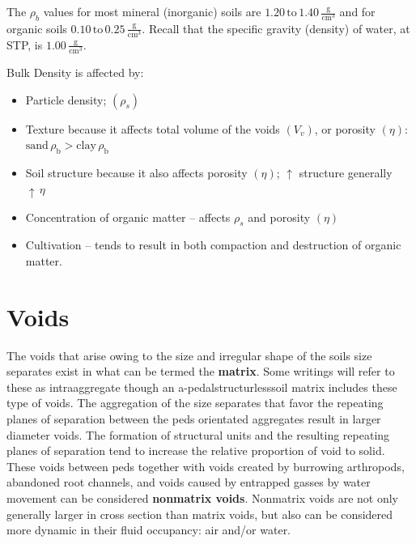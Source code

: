 \documentclass[a5paper]{book}
\begin{document}
The $\rho_b$ values for most mineral (inorganic) soils are $1.20\,\text{to}\,1.40\,\frac{\text{g}}{\text{cm}^3}$ and for organic soils $0.10\,\text{to}\,0.25\,\frac{\text{g}}{\text{cm}^3}$. Recall that the specific gravity (density) of water, at STP, is $1.00\,\frac{\text{g}}{\text{cm}^3}$.

Bulk Density is affected by:
\begin{itemize}
    \item Particle density; $\left(\rho_s\right)$
    \item Texture because it affects total volume of the voids $\left(V_v\right)$, or porosity $\left(\eta\right)$:  $\text{sand}\,\rho_{\text{b}} > \text{clay}\,\rho_{\text{b}}$
    \item Soil structure because it also affects porosity $\left(\eta\right)$; $\uparrow$  structure generally $\uparrow\,\eta$
    \item Concentration of organic matter – affects $\rho_s$ and porosity $\left(\eta\right)$
    \item Cultivation – tends to result in both compaction and destruction of organic matter.
\end{itemize}

\section{Voids}

The voids that arise owing to the size and irregular shape of the soils size separates exist in what can be termed the \textbf{matrix}. Some writings will refer to these as intraaggregate though an a-pedal\textemdash{}structurless\textemdash{}soil matrix includes these type of voids. The aggregation of the size separates that favor the repeating planes of separation between the peds orientated aggregates result in larger diameter voids. The formation of structural units and the resulting repeating planes of separation tend to increase the relative proportion of void to solid.  These voids between peds together with voids created by burrowing arthropods, abandoned root channels, and voids caused by entrapped gasses by water movement can be considered \textbf{nonmatrix voids}. Nonmatrix voids are not only generally larger in cross section than matrix voids, but also can be considered more dynamic in their fluid occupancy: air and/or water.  

\end{document}
